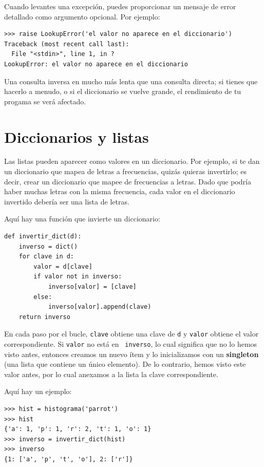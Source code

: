 \documentclass[10pt]{book}
\begin{document}
Cuando levantes una excepción, puedes proporcionar un mensaje de error detallado como argumento opcional.  Por ejemplo:

\begin{verbatim}
>>> raise LookupError('el valor no aparece en el diccionario')
Traceback (most recent call last):
  File "<stdin>", line 1, in ?
LookupError: el valor no aparece en el diccionario
\end{verbatim}
%
Una consulta inversa en mucho más lenta que una consulta directa; si
tienes que hacerlo a menudo, o si el diccionario se vuelve grande, el rendimiento
de tu progama se verá afectado.


\section{Diccionarios y listas}
\label{invert}

Las listas pueden aparecer como valores en un diccionario.  Por ejemplo, si
te dan un diccionario que mapea de letras a frecuencias,
quizás quieras invertirlo; es decir, crear un diccionario que mapee
de frecuencias a letras.  Dado que podría haber muchas letras
con la misma frecuencia, cada valor en el diccionario invertido
debería ser una lista de letras.

Aquí hay una función que invierte un diccionario:

\begin{verbatim}
def invertir_dict(d):
    inverso = dict()
    for clave in d:
        valor = d[clave]
        if valor not in inverso:
            inverso[valor] = [clave]
        else:
            inverso[valor].append(clave)
    return inverso
\end{verbatim}
%
En cada paso por el bucle, {\tt clave} obtiene una clave de {\tt d} y
{\tt valor} obtiene el valor correspondiente.  Si {\tt valor} no está en {\tt
  inverso}, lo cual significa que no lo hemos visto antes, entonces creamos un nuevo
ítem y lo inicializamos con un {\bf singleton} (una lista que contiene un
único elemento).  De lo contrario, hemos visto este valor antes, por lo cual
anexamos a la lista la clave correspondiente.  

Aquí hay un ejemplo:

\begin{verbatim}
>>> hist = histograma('parrot')
>>> hist
{'a': 1, 'p': 1, 'r': 2, 't': 1, 'o': 1}
>>> inverso = invertir_dict(hist)
>>> inverso
{1: ['a', 'p', 't', 'o'], 2: ['r']}
\end{verbatim}
\end{document}
